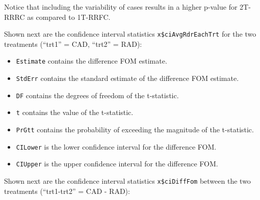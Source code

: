 \documentclass[
]{book}
\newenvironment{Shaded}{\begin{snugshade}}{\end{snugshade}}
\newcommand{\CommentTok}[1]{\textcolor[rgb]{0.56,0.35,0.01}{\textit{#1}}}
\newcommand{\FunctionTok}[1]{\textcolor[rgb]{0.00,0.00,0.00}{#1}}
\newcommand{\NormalTok}[1]{#1}
\newcommand{\SpecialCharTok}[1]{\textcolor[rgb]{0.00,0.00,0.00}{#1}}
\providecommand{\tightlist}{%
  \setlength{\itemsep}{0pt}\setlength{\parskip}{0pt}}
\begin{document}
Notice that including the variability of cases results in a higher p-value for 2T-RRRC as compared to 1T-RRFC.

Shown next are the confidence interval statistics \texttt{x\$ciAvgRdrEachTrt} for the two treatments (``trt1'' = CAD, ``trt2'' = RAD):

\begin{Shaded}
\end{Shaded}

\begin{itemize}
\tightlist
\item
  \texttt{Estimate} contains the difference FOM estimate.
\item
  \texttt{StdErr} contains the standard estimate of the difference FOM estimate.
\item
  \texttt{DF} contains the degrees of freedom of the t-statistic.
\item
  \texttt{t} contains the value of the t-statistic.
\item
  \texttt{PrGtt} contains the probability of exceeding the magnitude of the t-statistic.
\item
  \texttt{CILower} is the lower confidence interval for the difference FOM.
\item
  \texttt{CIUpper} is the upper confidence interval for the difference FOM.
\end{itemize}

Shown next are the confidence interval statistics \texttt{x\$ciDiffFom} between the two treatments (``trt1-trt2'' = CAD - RAD):

\begin{Shaded}
\end{Shaded}
\end{document}
